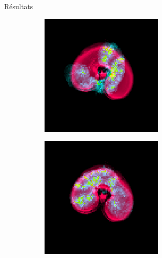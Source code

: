 \documentclass[10pt]{beamer}
\begin{document}
\begin{frame}{Résultats}
\begin{figure}[ht]
\begin{subfigure}[t]{0.33\textwidth}
      \caption{}
      \label{subfig:maldi_slice6}
    \end{subfigure}%
    \begin{subfigure}[t]{0.33\textwidth}
      \centering
      \includegraphics[width=0.65\textwidth]{fig/registration_overlay_slice6.png}
      \caption{}
      \label{subfig:}
    \end{subfigure}
    \vspace{-0.4cm}
    \begin{flushright}
      \begin{subfigure}[t]{0.33\textwidth}
        \centering
        \includegraphics[width=0.65\textwidth]{fig/registration_overlay_slice6_dt}
        \caption{}
        \label{subfig:registration_overlay_slice6}
      \end{subfigure}%

    \end{flushright}
  \end{figure}


\end{frame}
\end{document}
